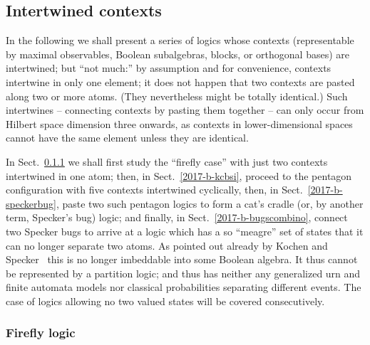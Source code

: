 \documentclass[%
  twocolumn,
 showpacs,
 showkeys,
 preprintnumbers,
 amsmath,amssymb,
 aps,
  pra,
  longbibliography,
 floatfix,
 ]{revtex4-1}
\begin{document}
\subsection{Intertwined contexts}

In the following we shall present a series of logics
whose contexts (representable by  maximal observables, Boolean subalgebras, blocks, or orthogonal bases)
are intertwined; but ``not much:'' by assumption and for convenience, contexts intertwine in only one element; it does not happen that two contexts
are  pasted~\cite{greechie:71,kalmbach-83,nav:91,pulmannova-91}
along two or more atoms. (They nevertheless might be totally identical.)
Such intertwines -- connecting contexts by pasting them together -- can only occur from Hilbert space dimension three onwards,
as contexts in lower-dimensional spaces  cannot have the same element unless they are identical.

In Sect.~\ref{2017-b-ffl} we shall first study the ``firefly case'' with just two contexts intertwined in one atom;
then, in Sect.~\ref{2017-b-kcbsi}, proceed to the pentagon configuration with five contexts intertwined cyclically,
then, in Sect.~\ref{2017-b-speckerbug}, paste two such pentagon logics to form a cat's cradle (or, by another term, Specker's bug) logic;
and finally, in Sect.~\ref{2017-b-bugscombino}, connect two Specker bugs to arrive at a logic which has a so ``meagre''
set of states that it can no longer separate two atoms.
As pointed out already by Kochen and Specker~\cite[p.~70,]{kochen1} this is no longer imbeddable into  some Boolean algebra.
It thus cannot be represented by a partition logic; and thus has neither any generalized urn and finite automata models
nor classical probabilities separating different events.
The case of logics allowing no two valued states will be covered consecutively.

\subsubsection{Firefly logic}
\label{2017-b-ffl}


\end{document}
